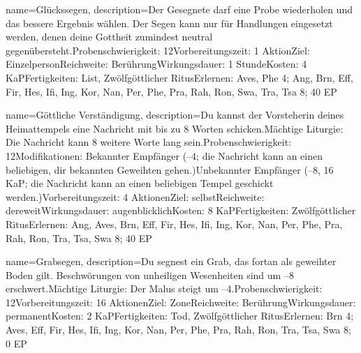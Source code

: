 {
    name={Glückssegen},
    description={Der Gesegnete darf eine Probe wiederholen und das bessere Ergebnis wählen. Der Segen kann nur für Handlungen eingesetzt werden, denen deine Gottheit zumindest neutral gegenübersteht.\newline Probenschwierigkeit: 12\newline Vorbereitungszeit: 1 Aktion\newline Ziel: Einzelperson\newline Reichweite: Berührung\newline Wirkungsdauer: 1 Stunde\newline Kosten: 4 KaP\newline Fertigkeiten: List, Zwölfgöttlicher Ritus\newline Erlernen: Aves, Phe 4; Ang, Brn, Eff, Fir, Hes, Ifi, Ing, Kor, Nan, Per, Phe, Pra, Rah, Ron, Swa, Tra, Tsa 8; 40 EP}
}


{
    name={Göttliche Verständigung},
    description={Du kannst der Vorsteherin deines Heimattempels eine Nachricht mit bis zu 8 Worten schicken.\newline Mächtige Liturgie: Die Nachricht kann 8 weitere Worte lang sein.\newline Probenschwierigkeit: 12\newline Modifikationen: Bekannter Empfänger (–4; die Nachricht kann an einen beliebigen, dir bekannten Geweihten gehen.)\newline Unbekannter Empfänger (–8, 16 KaP; die Nachricht kann an einen beliebigen Tempel geschickt werden.)\newline Vorbereitungszeit: 4 Aktionen\newline Ziel: selbst\newline Reichweite: dereweit\newline Wirkungsdauer: augenblicklich\newline Kosten: 8 KaP\newline Fertigkeiten: Zwölfgöttlicher Ritus\newline Erlernen: Ang, Aves, Brn, Eff, Fir, Hes, Ifi, Ing, Kor, Nan, Per, Phe, Pra, Rah, Ron, Tra, Tsa, Swa 8; 40 EP}
}


{
    name={Grabsegen},
    description={Du segnest ein Grab, das fortan als geweihter Boden gilt. Beschwörungen von unheiligen Wesenheiten sind um –8 erschwert.\newline Mächtige Liturgie: Der Malus steigt um –4.\newline Probenschwierigkeit: 12\newline Vorbereitungszeit: 16 Aktionen\newline Ziel: Zone\newline Reichweite: Berührung\newline Wirkungsdauer: permanent\newline Kosten: 2 KaP\newline Fertigkeiten: Tod, Zwölfgöttlicher Ritus\newline Erlernen: Brn 4; Aves, Eff, Fir, Hes, Ifi, Ing, Kor, Nan, Per, Phe, Pra, Rah, Ron, Tra, Tsa, Swa 8; 0 EP}
}


